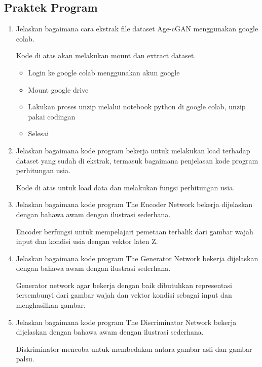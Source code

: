 \subsection{Praktek Program}
\begin{enumerate}
	\item Jelaskan bagaimana cara ekstrak file dataset Age-cGAN menggunakan google colab.
	\hfill\break

	
	Kode di atas akan melakukan mount dan extract dataset.
	\begin{itemize}
		\item Login ke google colab menggunakan akun google
		\item Mount google drive
		\item Lakukan proses unzip melalui notebook python di google colab, unzip pakai codingan
		\item Selesai
	\end{itemize}

	\item Jelaskan bagaimana kode program bekerja untuk melakukan load terhadap dataset yang sudah di ekstrak, termasuk bagaimana penjelasan kode program perhitungan usia.
	\hfill\break
	
	Kode di atas untuk load data dan melakukan fungsi perhitungan usia.

	\item Jelaskan bagaimana kode program The Encoder Network bekerja dijelaskan dengan bahawa awam dengan ilustrasi sederhana.
	\hfill\break
	
	Encoder berfungsi untuk mempelajari pemetaan terbalik dari gambar wajah input dan kondisi usia dengan vektor laten Z.

	\item Jelaskan bagaimana kode program The Generator Network bekerja dijelaskan dengan bahawa awam dengan ilustrasi sederhana.
	\hfill\break
	
	Generator network agar bekerja dengan baik dibutuhkan representasi tersembunyi dari gambar wajah dan vektor kondisi sebagai input dan menghasilkan gambar.

	\item Jelaskan bagaimana kode program The Discriminator Network bekerja dijelaskan dengan bahawa awam dengan ilustrasi sederhana.
	\hfill\break
	
	Diskriminator mencoba untuk membedakan antara gambar asli dan gambar palsu.


\end{enumerate}
